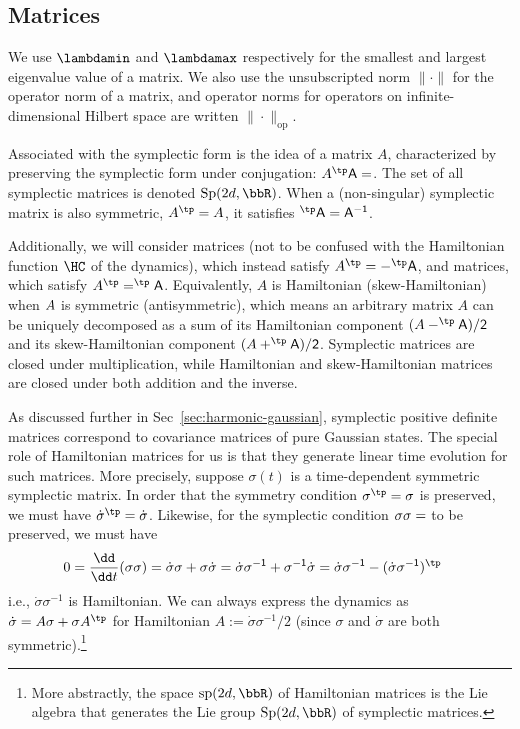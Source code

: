 \documentclass{article}
\numberwithin{equation}{section}
\begin{document}
 
\subsection{Matrices}\label{sec:matrix-basics}

We use $\lambdamin$ and $\lambdamax$ respectively for the smallest and largest eigenvalue value of a matrix.  We also use the unsubscripted norm $\|\cdot\|$ for the operator norm of a matrix, and operator norms for operators on infinite-dimensional Hilbert space are written $\|\cdot\|_{\text{op}}$.




Associated with the symplectic form is the idea of a  matrix $A$, characterized by preserving the symplectic form under conjugation: $A^\tp \sf A =\sf$. The set of all symplectic matrices is denoted $\mathrm{Sp}(2d,\bbR)$.  When a (non-singular) symplectic matrix is also symmetric, $A^\tp = A$, it satisfies $\sf^\tp A \sf = A^{-1}$.  

Additionally, we will consider  matrices (not to be confused with the Hamiltonian function $\HC$ of the dynamics), which instead satisfy $A^\tp = -\sf^\tp A \sf$, and  matrices, which satisfy $A^\tp = \sf^\tp A \sf$.  Equivalently, $A$ is Hamiltonian (skew-Hamiltonian) when $A \sf$ is symmetric (antisymmetric), which means an arbitrary matrix $A$ can be uniquely decomposed as a sum of its Hamiltonian component $(A-\sf^\tp A \sf)/2$ and its skew-Hamiltonian component $(A+\sf^\tp A \sf)/2$. Symplectic matrices are closed under multiplication, while Hamiltonian and skew-Hamiltonian matrices are closed under both addition and the inverse.

As discussed further in Sec~\ref{sec:harmonic-gaussian}, symplectic positive definite matrices correspond to covariance matrices of pure Gaussian states.  The special role of Hamiltonian matrices for us is that they generate linear time evolution for such matrices.  More precisely, suppose ${\sigma}(t)$ is a time-dependent symmetric symplectic matrix.
In order that the symmetry condition $\sigma^\tp = \sigma$ is preserved, we must have $\dot{\sigma}^\tp = \dot{\sigma}$. Likewise, for the symplectic condition $\sigma \sf\sigma = \sf$ to be preserved, we must have
\begin{equation}
\begin{split}
0 &= \frac{\dd}{\dd t} (\sigma \sf\sigma) = \dot{\sigma} \sf\sigma +  \sigma\sf\dot{\sigma} = \dot{\sigma}\sigma^{-1} \sf + \sf\sigma^{-1}\dot{\sigma} = \dot{\sigma}\sigma^{-1} \sf - (\dot{\sigma}\sigma^{-1} \sf)^\tp
\end{split}
\end{equation}
i.e., $\dot{\sigma}\sigma^{-1}$ is Hamiltonian.  We can always express the dynamics as $\dot{\sigma} = A\sigma + \sigma A^\tp$ for Hamiltonian $A := \dot{\sigma}\sigma^{-1}/2$ (since $\sigma$ and $\dot{\sigma}$ are both symmetric).\footnote{More abstractly, the space $\mathrm{sp}(2d,\bbR)$ of Hamiltonian matrices is the Lie algebra that generates the Lie group $\mathrm{Sp}(2d,\bbR)$ of symplectic matrices.}
\end{document}
